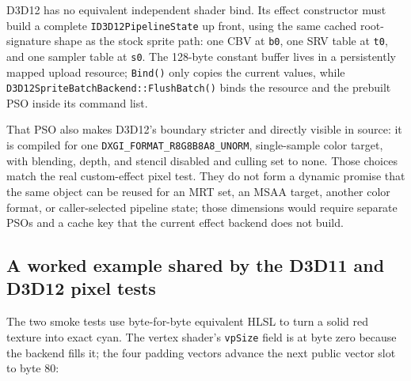 D3D12 has no equivalent independent shader bind. Its effect constructor must build a complete
\texttt{ID3D12PipelineState} up front, using the same cached root-signature shape as the stock
sprite path: one CBV at \texttt{b0}, one SRV table at \texttt{t0}, and one sampler table at
\texttt{s0}. The 128-byte constant buffer lives in a persistently mapped upload resource;
\texttt{Bind()} only copies the current values, while
\texttt{D3D12SpriteBatchBackend::FlushBatch()} binds the resource and the prebuilt PSO inside
its command list.

That PSO also makes D3D12's boundary stricter and directly visible in source: it is compiled
for one \texttt{DXGI\_FORMAT\_R8G8B8A8\_UNORM}, single-sample color target, with blending,
depth, and stencil disabled and culling set to none. Those choices match the real custom-effect
pixel test. They do not form a dynamic promise that the same object can be reused for an MRT
set, an MSAA target, another color format, or caller-selected pipeline state; those dimensions
would require separate PSOs and a cache key that the current effect backend does not build.

\subsection{A worked example shared by the D3D11 and D3D12 pixel tests}

The two smoke tests use byte-for-byte equivalent HLSL to turn a solid red texture into exact
cyan. The vertex shader's \texttt{vpSize} field is at byte zero because the backend fills it;
the four padding vectors advance the next public vector slot to byte 80:

